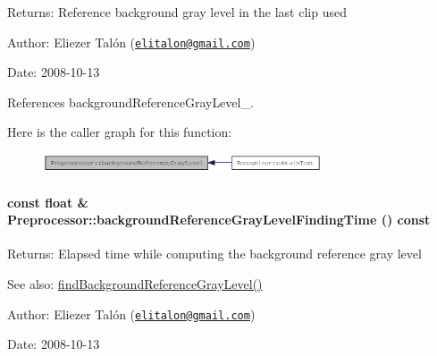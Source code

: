 \begin{Desc}
\item[Returns:]Reference background gray level in the last clip used\end{Desc}
\begin{Desc}
\item[Author:]Eliezer Talón (\href{mailto:elitalon@gmail.com}{\tt elitalon@gmail.com}) \end{Desc}
\begin{Desc}
\item[Date:]2008-10-13 \end{Desc}


References backgroundReferenceGrayLevel\_\-.

Here is the caller graph for this function:\nopagebreak
\begin{figure}[H]
\begin{center}
\leavevmode
\includegraphics[width=234pt]{class_preprocessor_b435116619b7b254d9e788476c012e8a_icgraph}
\end{center}
\end{figure}
\hypertarget{class_preprocessor_001ec84b94a5d92a2bce6b854b4d3e7d}{
\paragraph[{backgroundReferenceGrayLevelFindingTime}]{\setlength{\rightskip}{0pt plus 5cm}const float \& Preprocessor::backgroundReferenceGrayLevelFindingTime () const}\hfill}
\label{class_preprocessor_001ec84b94a5d92a2bce6b854b4d3e7d}


\begin{Desc}
\item[Returns:]Elapsed time while computing the background reference gray level\end{Desc}
\begin{Desc}
\item[See also:]\hyperlink{class_preprocessor_a941f81382bd8e235e4dd12481342be4}{findBackgroundReferenceGrayLevel()}\end{Desc}
\begin{Desc}
\item[Author:]Eliezer Talón (\href{mailto:elitalon@gmail.com}{\tt elitalon@gmail.com}) \end{Desc}
\begin{Desc}
\item[Date:]2008-10-13 \end{Desc}


